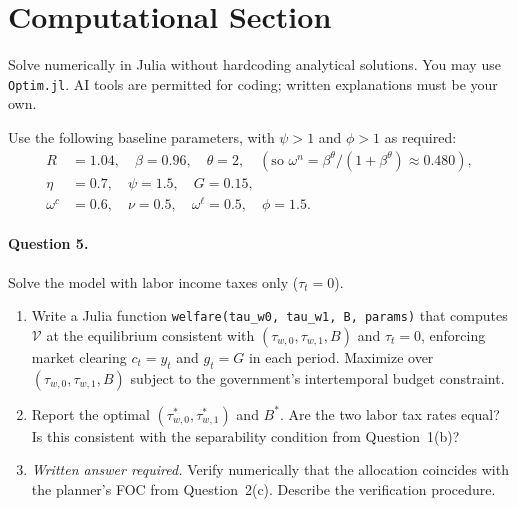 \section{Computational Section}
\label{sec:computation}
 
\begin{calloutnote}[Instructions]
Solve numerically in Julia without hardcoding analytical solutions. You may use \texttt{Optim.jl}. AI tools are permitted for coding; written explanations must be your own.
\end{calloutnote}
 
Use the following baseline parameters, with $\psi > 1$ and $\phi > 1$ as required:
%
\begin{equation}
\begin{aligned}
    R &= 1.04, \quad \beta = 0.96, \quad \theta = 2,
    \quad (\text{so } \omega^n = \beta^\theta/(1+\beta^\theta) \approx 0.480), \\
    \eta &= 0.7, \quad \psi = 1.5, \quad G = 0.15, \\
    \omega^c &= 0.6, \quad \nu = 0.5, \quad \omega^\ell = 0.5, \quad \phi = 1.5.
\end{aligned}
    \label{eq:params}
\end{equation}
 
\paragraph{Question 5.}
Solve the model with labor income taxes only ($\tau_t = 0$).
 
\begin{enumerate}[label=(\alph*)]
    \item Write a Julia function \texttt{welfare(tau\_w0, tau\_w1, B, params)} that computes $\mathcal{V}$ at the equilibrium consistent with $(\tau_{w,0}, \tau_{w,1}, B)$ and $\tau_t = 0$, enforcing market clearing $c_t = y_t$ and $g_t = G$ in each period. Maximize over $(\tau_{w,0}, \tau_{w,1}, B)$ subject to the government's intertemporal budget constraint.
 
    \item Report the optimal $(\tau_{w,0}^*, \tau_{w,1}^*)$ and $B^*$. Are the two labor tax rates equal? Is this consistent with the separability condition from Question~1(b)?
 
    \item \emph{Written answer required.} Verify numerically that the allocation coincides with the planner's FOC from Question~2(c). Describe the verification procedure.
\end{enumerate}
 
